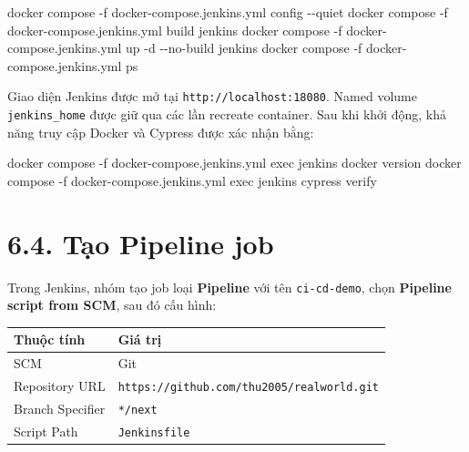 \documentclass[
  vietnamese,
  12pt,
  a4paper,
  oneside]{report}
\newenvironment{Shaded}{}{}
\newcommand{\AttributeTok}[1]{\textcolor[rgb]{0.49,0.56,0.16}{#1}}
\newcommand{\ExtensionTok}[1]{#1}
\newcommand{\NormalTok}[1]{#1}
\begin{document}
\begin{Shaded}
\begin{Highlighting}[]
\ExtensionTok{docker}\NormalTok{ compose }\AttributeTok{{-}f}\NormalTok{ docker{-}compose.jenkins.yml config }\AttributeTok{{-}{-}quiet}
\ExtensionTok{docker}\NormalTok{ compose }\AttributeTok{{-}f}\NormalTok{ docker{-}compose.jenkins.yml build jenkins}
\ExtensionTok{docker}\NormalTok{ compose }\AttributeTok{{-}f}\NormalTok{ docker{-}compose.jenkins.yml up }\AttributeTok{{-}d} \AttributeTok{{-}{-}no{-}build}\NormalTok{ jenkins}
\ExtensionTok{docker}\NormalTok{ compose }\AttributeTok{{-}f}\NormalTok{ docker{-}compose.jenkins.yml ps}
\end{Highlighting}
\end{Shaded}

Giao diện Jenkins được mở tại \texttt{http://localhost:18080}. Named
volume \texttt{jenkins\_home} được giữ qua các lần recreate container.
Sau khi khởi động, khả năng truy cập Docker và Cypress được xác nhận
bằng:

\begin{Shaded}
\begin{Highlighting}[]
\ExtensionTok{docker}\NormalTok{ compose }\AttributeTok{{-}f}\NormalTok{ docker{-}compose.jenkins.yml exec jenkins docker version}
\ExtensionTok{docker}\NormalTok{ compose }\AttributeTok{{-}f}\NormalTok{ docker{-}compose.jenkins.yml exec jenkins cypress verify}
\end{Highlighting}
\end{Shaded}

\section{6.4. Tạo Pipeline job}\label{64-tux1ea1o-pipeline-job}

Trong Jenkins, nhóm tạo job loại \textbf{Pipeline} với tên
\texttt{ci-cd-demo}, chọn \textbf{Pipeline script from SCM}, sau đó cấu
hình:

\begin{longtable}[]{@{}
  >{\raggedright\arraybackslash}p{}
  >{\raggedright\arraybackslash}p{}@{}}
\toprule\noalign{}
\begin{minipage}[b]{\linewidth}\raggedright
Thuộc tính
\end{minipage} & \begin{minipage}[b]{\linewidth}\raggedright
Giá trị
\end{minipage} \\
\midrule\noalign{}
\endhead
\bottomrule\noalign{}
\endlastfoot
SCM & Git \\
Repository URL & \nolinkurl{https://github.com/thu2005/realworld.git} \\
Branch Specifier & \texttt{*/next} \\
Script Path & \texttt{Jenkinsfile} \\
\end{longtable}
\end{document}
